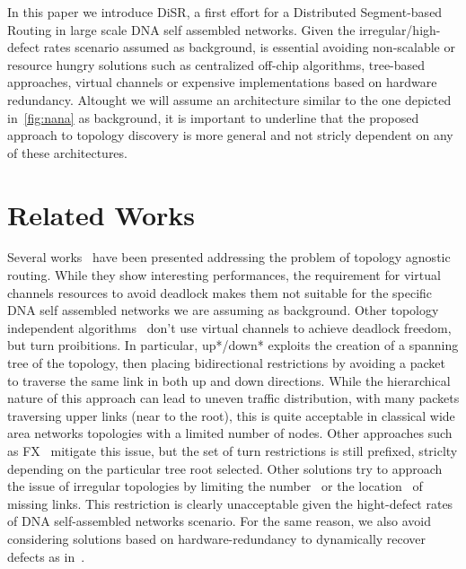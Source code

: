 In this paper we introduce DiSR, a first effort for a Distributed
Segment-based Routing in large scale DNA self assembled networks.
Given the irregular/high-defect rates scenario assumed as background, is essential
avoiding non-scalable or resource hungry solutions such as
centralized off-chip algorithms, tree-based approaches, virtual channels
or expensive implementations based on hardware redundancy.
Altought we will assume an architecture similar to the one depicted
in~\ref{fig:nana} as background, it
is important to underline that the proposed approach to topology
discovery is more general and not stricly dependent on any of these
architectures.


\section{Related Works}

Several works~\cite{sancho2002, skeie2002, skeie2004, koibuchi2003} have been presented addressing the problem of topology
agnostic routing. While they show interesting
performances, the requirement for virtual channels resources 
to avoid deadlock makes them not suitable for the specific DNA self
assembled networks we are assuming as background.
Other topology independent algorithms~\cite{schroeder1991, koibuchi2001, cherkasova1996} don't use virtual channels to
achieve deadlock freedom, but turn proibitions. 
In particular, up*/down* exploits the creation of a spanning tree of the
topology, then placing bidirectional restrictions by avoiding a packet
to traverse the same link in both up and down directions.
While the hierarchical nature of this approach can lead to uneven traffic
distribution, with many packets traversing upper links (near to the
root), this is quite acceptable in classical wide area networks
topologies with a limited number of nodes. Other approaches such as
FX~\cite{sancho2000} mitigate this
issue, but the set of turn restrictions is still prefixed,
striclty depending on the particular tree root selected. 
Other solutions try to approach the issue of irregular
topologies by limiting the number~\cite{dally1994, duato1997, gomez2004, koibuchi2008} or the
location~\cite{zhang2008, sui2000, flich2008, liu2011} of missing links. This
restriction is clearly unacceptable given the hight-defect rates of
DNA self-assembled networks scenario. For the same reason, we also
avoid considering solutions based on hardware-redundancy to
dynamically recover defects as in~\cite{constantinides2006, kohler2010, kim2006, park2006}. 

